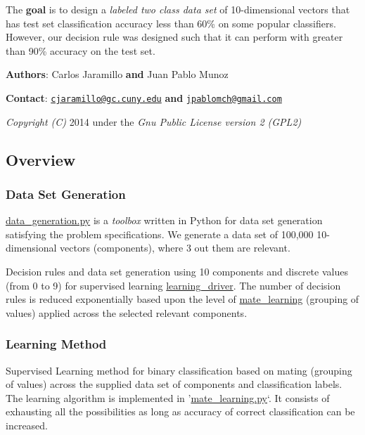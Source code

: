 The {\bfseries goal} is to design a {\itshape labeled two class data set} of 10-\/dimensional vectors that has test set classification accuracy less than 60\% on some popular classifiers. However, our decision rule was designed such that it can perform with greater than 90\% accuracy on the test set.


\begin{DoxyItemize}
\item {\bfseries Authors}\+: Carlos Jaramillo {\bfseries and} Juan Pablo Munoz
\item {\bfseries Contact}\+: \href{mailto:cjaramillo@gc.cuny.edu}{\tt cjaramillo@gc.\+cuny.\+edu} {\bfseries and} \href{mailto:jpablomch@gmail.com}{\tt jpablomch@gmail.\+com}
\end{DoxyItemize}

{\itshape Copyright (C)} 2014 under the {\itshape Gnu Public License version 2 (G\+P\+L2)}

\subsection*{Overview}

\subsubsection*{Data Set Generation}

{\ttfamily \hyperlink{data__generation_8py}{data\+\_\+generation.\+py}} is a {\itshape toolbox} written in Python for data set generation satisfying the problem specifications. We generate a data set of 100,000 10-\/dimensional vectors (components), where 3 out them are relevant.

Decision rules and data set generation using 10 components and discrete values (from 0 to 9) for supervised learning \hyperlink{namespacelearning__driver}{learning\+\_\+driver}. The number of decision rules is reduced exponentially based upon the level of \hyperlink{namespacemate__learning}{mate\+\_\+learning} (grouping of values) applied across the selected relevant components.

\subsubsection*{Learning Method}

Supervised Learning method for binary classification based on mating (grouping of values) across the supplied data set of components and classification labels. The learning algorithm is implemented in '\hyperlink{mate__learning_8py}{mate\+\_\+learning.\+py}`. It consists of exhausting all the possibilities as long as accuracy of correct classification can be increased.

